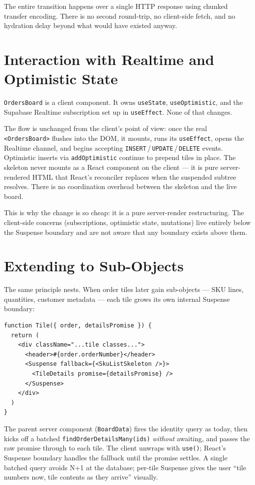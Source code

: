 \documentclass[11pt]{article}
\begin{document}
The entire transition happens over a single HTTP response using chunked transfer encoding. There is no second round-trip, no client-side fetch, and no hydration delay beyond what would have existed anyway.

\section{Interaction with Realtime and Optimistic State}

\texttt{OrdersBoard} is a client component. It owns \texttt{useState}, \texttt{useOptimistic}, and the Supabase Realtime subscription set up in \texttt{useEffect}. None of that changes.

The flow is unchanged from the client's point of view: once the real \texttt{<OrdersBoard>} flushes into the DOM, it mounts, runs its \texttt{useEffect}, opens the Realtime channel, and begins accepting \texttt{INSERT}\,/\,\texttt{UPDATE}\,/\,\texttt{DELETE} events. Optimistic inserts via \texttt{addOptimistic} continue to prepend tiles in place. The skeleton never mounts as a React component on the client --- it is pure server-rendered HTML that React's reconciler replaces when the suspended subtree resolves. There is no coordination overhead between the skeleton and the live board.

This is why the change is so cheap: it is a pure server-render restructuring. The client-side concerns (subscriptions, optimistic state, mutations) live entirely below the Suspense boundary and are not aware that any boundary exists above them.

\section{Extending to Sub-Objects}

The same principle nests. When order tiles later gain sub-objects --- SKU lines, quantities, customer metadata --- each tile grows its own internal Suspense boundary:

\begin{lstlisting}
function Tile({ order, detailsPromise }) {
  return (
    <div className="...tile classes...">
      <header>#{order.orderNumber}</header>
      <Suspense fallback={<SkuListSkeleton />}>
        <TileDetails promise={detailsPromise} />
      </Suspense>
    </div>
  )
}
\end{lstlisting}

The parent server component (\texttt{BoardData}) fires the identity query as today, then kicks off a batched \texttt{findOrderDetailsMany(ids)} \emph{without} awaiting, and passes the raw promise through to each tile. The client unwraps with \texttt{use()}; React's Suspense boundary handles the fallback until the promise settles. A single batched query avoids N+1 at the database; per-tile Suspense gives the user ``tile numbers now, tile contents as they arrive'' visually.
\end{document}
